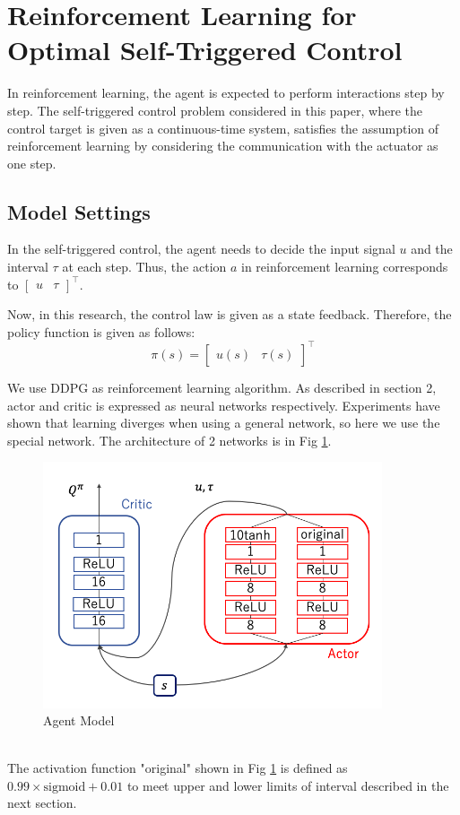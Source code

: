 \documentclass[english, dvipdfmx]{ampmt}             %
\begin{document}
\section{Reinforcement Learning for Optimal Self-Triggered Control}
In reinforcement learning, the agent is expected to perform interactions step by step. The self-triggered control problem considered in this paper, where the control target is given as a continuous-time system, satisfies the assumption of reinforcement learning by considering the communication with the actuator as one step.\par

\subsection{Model Settings}
In the self-triggered control, the agent needs to decide the input signal $u$ and the interval $\tau$ at each step. Thus, the action $a$ in reinforcement learning corresponds to $\begin{bmatrix}u & \tau \end{bmatrix}^{\top}$. \par
Now, in this research, the control law is given as a state feedback. Therefore, the policy function is given as follows:
\begin{equation}
	\pi(s) = \begin{bmatrix}u(s) & \tau(s)\end{bmatrix}^{\top}
\end{equation}\par
We use DDPG as reinforcement learning algorithm. As described in section 2, actor and critic is expressed as neural networks respectively. Experiments have shown that learning diverges when using a general network, so here we use the special network. The architecture of 2 networks is in Fig \ref{NN}.
\begin{figure}[h]
	\centering
 	\includegraphics[width=10cm]{model.png}
 	\caption{Agent Model} \label{NN}
\end{figure}\\
The activation function "original" shown in Fig \ref{NN} is defined as $0.99 \times \textrm{sigmoid} + 0.01$ to meet upper and lower limits of interval described in the next section.\par
\end{document}
